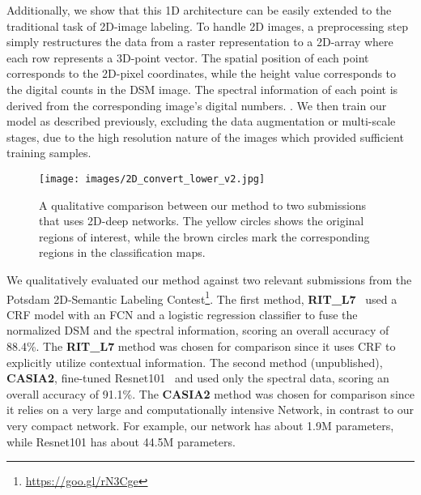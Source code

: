\documentclass[final,3p,times,twocolumn,authoryear]{elsarticle}
\begin{document}
Additionally, we show that this 1D architecture can be easily extended to the traditional task of 2D-image labeling. 
To handle 2D images, a preprocessing step simply restructures the data from a raster representation to a 2D-array where each row represents a 3D-point vector.%
The spatial position of each point corresponds to the 2D-pixel coordinates, while the height value corresponds to the digital counts in the DSM image.
The spectral information of each point is derived from the corresponding image's digital numbers. . 
We then train our model as described previously, excluding the data augmentation or multi-scale stages, due to the high resolution nature of the images which provided sufficient training samples. %
\begin{figure*}[th]
\begin{center}
\texttt{[image: images/2D\_convert\_lower\_v2.jpg]}
\end{center}
\caption{A qualitative comparison between our method to two submissions that uses 2D-deep networks. The yellow circles shows the original regions of interest, while the brown circles mark the corresponding regions in the classification maps.}
\label{fig:2D_seg_lower}
\end{figure*}

We qualitatively evaluated our method against two relevant submissions from the Potsdam 2D-Semantic Labeling Contest\footnote{\url{https://goo.gl/rN3Cge}}. 
The first method, {\bf RIT\_L7}~\citep{Yansong} used a CRF model with an FCN and a logistic regression classifier to fuse the normalized DSM and the spectral information, scoring an overall accuracy of 88.4\%.
The {\bf RIT\_L7} method was chosen for comparison since it uses CRF to explicitly utilize contextual information.
The second method (unpublished), {\bf CASIA2}, fine-tuned Resnet101~\citep{resnet} and used only the spectral data, scoring an overall accuracy of 91.1\%. 
 The {\bf CASIA2} method was chosen for comparison since it relies on a very large and computationally intensive Network, in contrast to our very compact network. 
For example, our network has about 1.9M parameters, while Resnet101 has about 44.5M parameters. 
\end{document}
